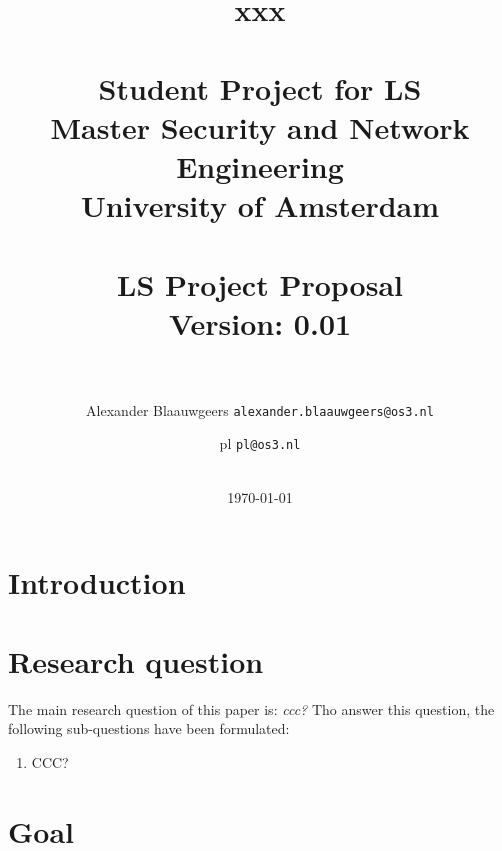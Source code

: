 \documentclass[journal]{IEEEtran}
\begin{document}
    \title{xxx\\~\\
    \large{Student Project for LS
    \\Master Security and Network Engineering \\ University of Amsterdam\\
    \\LS Project Proposal\\}
    \textbf{Version:} 0.01\\~\\}
    \author{
        Alexander Blaauwgeers \texttt{alexander.blaauwgeers@os3.nl} \and
        pl \texttt{pl@os3.nl} %
    }

	\date{
	\\ \textnormal \today
	}
	\maketitle
	\setlength{\parindent}{0pt}

%
	\newpage

	
\section{Introduction} 


\section{Research question} 
The main research question of this paper is: 
\newline
\newline
\textit{ccc?}
\newline
\newline
Tho answer this question, the following sub-questions have been formulated:
\begin{enumerate}
\item CCC? 
\end{enumerate}

\section{Goal}
\end{document}
